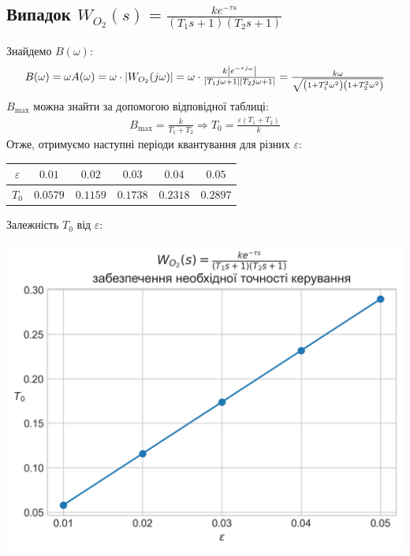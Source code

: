 \subsection{Випадок \texorpdfstring{$W_{O_2}(s) = \frac{k e^{-\tau s}}{(T_1 s + 1)(T_2 s + 1)}$}{2}}
Знайдемо $B(\omega)$:
\begin{gather}
    \mbox{\normalsize $B(\omega) = \omega A(\omega) = \omega \cdot \left| W_{O_2}(j \omega)\right| = 
    \omega \cdot \frac{
        k \left| e^{-\tau j \omega}\right|
    }{
        \left|T_1 j \omega + 1\right| \left|T_2 j \omega + 1\right|
    } = \frac{k \omega}{\sqrt{\left(1 + T_1^2 \omega^2\right)\left(1 + T_2^2 \omega^2\right)}}$}
\end{gather}
$B_{\max}$ можна знайти за допомогою відповідної таблиці:
\begin{gather}
    B_{\max} = \frac{k}{T_1 + T_2} \Rightarrow T_0 = \frac{\varepsilon (T_1 + T_2)}{k}
\end{gather}
Отже, отримуємо наступні періоди квантування для різних $\varepsilon$:
\begin{center}
    \begin{tabular}{|c|c|c|c|c|c|}
        \hline
        $\varepsilon$ & $0.01$ & $0.02$ & $0.03$ & $0.04$ & $0.05$ \\
        \hline
        $T_0$ & $0.0579$ & $0.1159$ & $0.1738$ & $0.2318$ & $0.2897$ \\
        \hline
    \end{tabular}
\end{center}
Залежність $T_0$ від $\varepsilon$:
\begin{center}
    \includegraphics[scale=0.9]{pics/W_02_accur.png}
\end{center}
